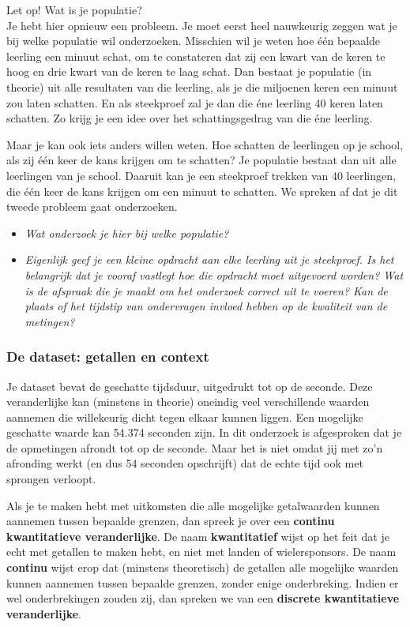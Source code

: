 \documentclass[11pt]{article}
\newcommand{\vraag}[2]{\begin{itemize}\item {\it #1} \vspace*{#2}\end{itemize}}
\begin{document}
Let op! Wat is je populatie?\\
Je hebt hier opnieuw een probleem. Je moet eerst heel nauwkeurig zeggen wat je bij welke populatie
wil onderzoeken. Misschien wil je weten hoe één bepaalde leerling een minuut schat, om te
constateren dat zij een kwart van de keren te hoog en drie kwart van de keren te laag schat. Dan
bestaat je populatie (in theorie) uit alle resultaten van die leerling, als je die miljoenen keren een
minuut zou laten schatten. En als steekproef zal je dan die éne leerling 40
keren laten schatten. Zo krijg je een idee over het schattingsgedrag van die
éne leerling.

Maar je kan ook iets anders willen weten. Hoe schatten de leerlingen op je
school, als zij één keer de kans krijgen om te schatten? Je populatie bestaat
dan uit alle leerlingen van je school. Daaruit kan je een steekproef trekken
van 40 leerlingen, die één keer de kans krijgen om een minuut te schatten.
We spreken af dat je dit tweede probleem gaat onderzoeken.

\vraag{Wat onderzoek je hier bij welke populatie?}{4cm}

\vraag{Eigenlijk geef je een kleine opdracht aan elke leerling uit je steekproef. Is het belangrijk dat
je vooraf vastlegt hoe die opdracht moet uitgevoerd worden? Wat is de afspraak die je maakt
om het onderzoek correct uit te voeren? Kan de plaats of het tijdstip van ondervragen
invloed hebben op de kwaliteit van de metingen?}{4cm}

\subsubsection{De dataset: getallen en context}

Je dataset bevat de geschatte tijdsduur, uitgedrukt tot op de seconde. Deze veranderlijke kan
(minstens in theorie) oneindig veel verschillende waarden aannemen die willekeurig dicht tegen
elkaar kunnen liggen. Een mogelijke geschatte waarde kan 54.374 seconden zijn. In dit onderzoek is
afgesproken dat je de opmetingen afrondt tot op de seconde. Maar het is niet omdat jij met zo’n
afronding werkt (en dus 54 seconden opschrijft) dat de echte tijd ook met sprongen verloopt.

Als je te maken hebt met uitkomsten die alle mogelijke getalwaarden kunnen aannemen tussen
bepaalde grenzen, dan spreek je over een {\bf continu kwantitatieve veranderlijke}. De
naam {\bf kwantitatief} wijst op het feit dat je echt met getallen te maken hebt, en niet met landen of
wielersponsors. De naam {\bf continu} wijst erop dat (minstens theoretisch) de getallen alle mogelijke
waarden kunnen aannemen tussen bepaalde grenzen, zonder enige onderbreking. Indien er wel onderbrekingen zouden zij, dan spreken we van een {\bf discrete kwantitatieve veranderlijke}.
\end{document}
